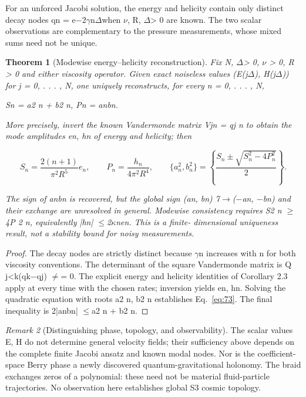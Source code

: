 \documentclass[10pt,letterpaper]{article}
\newtheorem{theorem}{Theorem}[section]
\theoremstyle{remark}
\newtheorem{remark}[theorem]{Remark}
\begin{document}
For an unforced Jacobi solution, the energy and helicity contain only distinct decay nodes qn = e\(- \)2\(\gamma \)n\(\Delta \)when \(\nu \), R, \(\Delta \)> 0 are known. The two scalar observations are complementary to the pressure measurements, whose mixed sums need not be unique.


\begin{theorem}[Modewise energy–helicity reconstruction]

Fix N, \(\Delta \)> 0, \(\nu \) > 0, R > 0 and either viscosity operator. Given exact noiseless values (E(j\(\Delta \)), H(j\(\Delta \))) for j = 0, . . . , N, one uniquely reconstructs, for every n = 0, . . . , N,

Sn = a2 n + b2 n, Pn = anbn.


More precisely, invert the known Vandermonde matrix Vjn = qj n to obtain the mode amplitudes en, hn of energy and helicity; then



\begin{equation}
\tag{73}\label{eq:73}
S_n=\frac{2(n+1)}{\pi^2R^5}e_n,\qquad P_n=\frac{h_n}{4\pi^2R^4},\qquad\{a_n^2,b_n^2\}=\left\{\frac{S_n\pm\sqrt{S_n^2-4P_n^2}}{2}\right\}.
\end{equation}

The sign of anbn is recovered, but the global sign (an, bn) 7\(\to \)(\(- \)an, \(- \)bn) and their exchange are unresolved in general. Modewise consistency requires S2 n \(\ge \)4P 2 n, equivalently |hn| \(\le \)2\(\kappa \)nen. This is a finite- dimensional uniqueness result, not a stability bound for noisy measurements.


\end{theorem}

\begin{proof}
The decay nodes are strictly distinct because \(\gamma \)n increases with n for both viscosity conventions. The determinant of the square Vandermonde matrix is Q j<k(qk\(- \)qj) \(\ne \)= 0. The explicit energy and helicity identities of Corollary 2.3 apply at every time with the chosen rates; inversion yields en, hn. Solving the quadratic equation with roots a2 n, b2 n establishes Eq.~\eqref{eq:73}. The final inequality is 2|anbn| \(\le \)a2 n + b2 n.

\end{proof}

\begin{remark}[Distinguishing phase, topology, and observability]

The scalar values E, H do not determine general velocity fields; their sufficiency above depends on the complete finite Jacobi ansatz and known modal nodes. Nor is the coefficient-space Berry phase a newly discovered quantum-gravitational holonomy. The braid exchanges zeros of a polynomial: these need not be material fluid-particle trajectories. No observation here establishes global S3 cosmic topology.

\end{remark}
\end{document}
